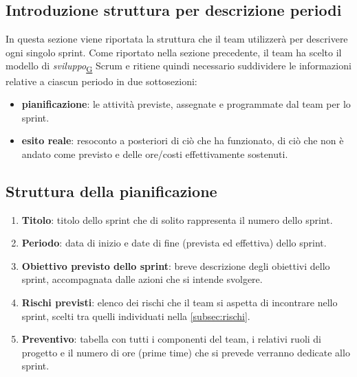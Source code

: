 \documentclass[a4paper,12pt]{article}
\begin{document}
{    \subsection{Introduzione struttura per descrizione periodi}{
        In questa sezione viene riportata la struttura che il team utilizzerà per descrivere ogni singolo sprint. Come riportato nella sezione precedente, il team ha scelto il modello di \textit{sviluppo}\textsubscript{\href{https://atlasteam9.github.io/Atlas/glossario.html\#Sviluppo}{G}} Scrum e ritiene quindi necessario suddividere le informazioni relative a ciascun periodo in due sottosezioni: 
        \begin{itemize}
            \item \textbf{pianificazione}: le attività previste, assegnate e programmate dal team per lo sprint.
            \item \textbf{esito reale}: resoconto a posteriori di ciò che ha funzionato, di ciò che non è andato come previsto e delle ore/costi effettivamente sostenuti.
        \end{itemize}    
    }
    \subsection{Struttura della pianificazione}{
        \begin{enumerate}
            \item \textbf{Titolo}: titolo dello sprint che di solito rappresenta il numero dello sprint.
            \item \textbf{Periodo}: data di inizio e date di fine (prevista ed effettiva) dello sprint.
            \item \textbf{Obiettivo previsto dello sprint}: breve descrizione degli obiettivi dello sprint, accompagnata dalle azioni che si intende svolgere.
            \item \textbf{Rischi previsti}: elenco dei rischi che il team si aspetta di incontrare nello sprint, scelti tra quelli individuati nella \autoref{subsec:rischi}.
            \item \textbf{Preventivo}: tabella con tutti i componenti del team, i relativi ruoli di progetto e il numero di ore (prime time) che si prevede verranno dedicate allo sprint.
        \end{enumerate}    
    }
}
\end{document}
